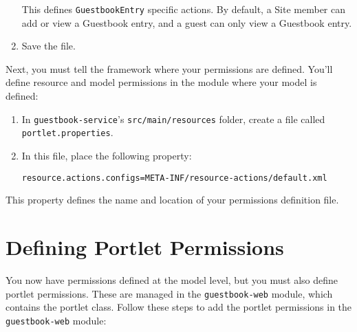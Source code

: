 \begin{enumerate}
  This defines \texttt{GuestbookEntry} specific actions. By default, a
  Site member can add or view a Guestbook entry, and a guest can only
  view a Guestbook entry.
\item
  Save the file.
\end{enumerate}

Next, you must tell the framework where your permissions are defined.
You'll define resource and model permissions in the module where your
model is defined:

\begin{enumerate}
\def\labelenumi{\arabic{enumi}.}
\item
  In \texttt{guestbook-service}'s \texttt{src/main/resources} folder,
  create a file called \texttt{portlet.properties}.
\item
  In this file, place the following property:

\begin{verbatim}
resource.actions.configs=META-INF/resource-actions/default.xml
\end{verbatim}
\end{enumerate}

This property defines the name and location of your permissions
definition file.

\section{Defining Portlet
Permissions}\label{defining-portlet-permissions}

You now have permissions defined at the model level, but you must also
define portlet permissions. These are managed in the
\texttt{guestbook-web} module, which contains the portlet class. Follow
these steps to add the portlet permissions in the \texttt{guestbook-web}
module:

